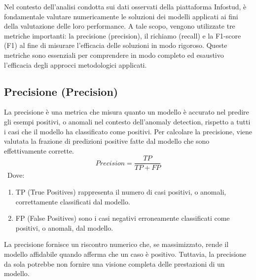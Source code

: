 
Nel contesto dell'analisi condotta sui dati osservati della piattaforma Infostud, è fondamentale valutare numericamente 
le soluzioni dei modelli applicati ai fini della valutazione delle loro performance. A tale scopo, vengono utilizzate 
tre metriche importanti: la precisione (precision), il richiamo (recall) e la F1-score (F1) al fine di misurare 
l'efficacia delle soluzioni in modo rigoroso. Queste metriche sono essenziali per comprendere in modo completo ed 
esaustivo l'efficacia degli approcci metodologici applicati.

\subsection{Precisione (Precision)}\label{precision}
    La precisione è una metrica che misura quanto un modello è accurato nel predire gli esempi positivi, o anomali nel 
    contesto dell'anomaly detection, rispetto a tutti 
    i casi che il modello ha classificato come positivi. 
    Per calcolare la precisione, viene valutata la frazione di predizioni positive fatte dal modello che sono effettivamente 
    corrette.
    \[Precision = \frac{TP}{TP+FP}\]\
    Dove:
    \begin{enumerate}
        \item TP (True Positives) rappresenta il numero di casi positivi, o anomali,
        correttamente classificati dal modello.
        \item FP (False Positives) sono i casi negativi erroneamente classificati come positivi, o anomali, dal modello.
    \end{enumerate}
    La precisione fornisce un riscontro numerico che, se massimizzato, rende il modello affidabile quando afferma 
    che un caso è positivo. Tuttavia, la precisione da sola potrebbe non fornire una visione completa delle prestazioni 
    di un modello.

